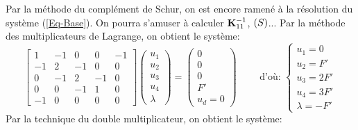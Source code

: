 \medskipvm
Par la méthode du complément de Schur, on est encore ramené à la résolution du système (\ref{Eq-Base}).
On pourra s'amuser à calculer $\mathbf{K}_{11}^{-1}$, $\left( S\right)$...
\medskipvm
Par la méthode des multiplicateurs de Lagrange, on obtient le système:
\begin{equation}
\begin{bmatrix} 1 & -1 & 0 & 0 & -1 \\ -1 & 2 & -1 & 0 & 0 \\ 0 & -1 & 2 & -1 & 0\\ 0&0&-1&1& 0 \\ -1&0&0&0&0
\end{bmatrix}
\begin{pmatrix} u_1\\u_2\\u_3\\u_4\\ \lambda \end{pmatrix}
=
\begin{pmatrix} 0\\0\\0\\F' \\ u_d=0\end{pmatrix}
\qquad \text{ d'où: } 
\left\{\begin{array}{l} u_1=0 \\ u_2=F' \\ u_3=2F' \\ u_4=3F' \\ \lambda = -F' \end{array}\right.
\end{equation}
\medskipvm
Par la technique du double multiplicateur, on obtient le système:
